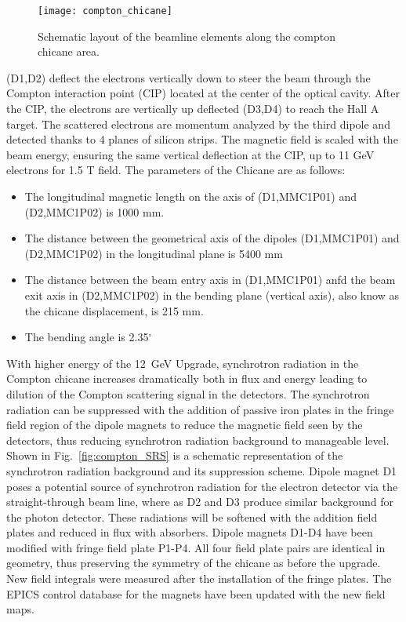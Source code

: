{\begin{figure}[htp]
    \begin{center}
        \texttt{[image: compton\_chicane]}
    \end{center}
    \caption[compton:chicane schematic]{
            Schematic layout of the beamline elements along the compton chicane area.
            }
    \label{fig:compton_chicane}
 \end{figure}
(D1,D2) deflect  the electrons  vertically down to steer
the beam through the Compton interaction point (CIP) located at the center of
the optical cavity. After the CIP, the electrons are vertically up deflected (D3,D4) to reach
the Hall A target. The scattered electrons are momentum analyzed by the third dipole and
detected thanks to 4 planes of silicon strips.
The magnetic field is scaled with the beam energy, ensuring the same vertical deflection at the CIP,
up to 11 GeV electrons for 1.5 T field. The parameters of the Chicane are as follows:
\begin{itemize}
	\item The longitudinal magnetic length on the axis of (D1,MMC1P01) and
	(D2,MMC1P02) is 1000 mm.
       \item The distance between the geometrical axis of the
        dipoles (D1,MMC1P01) and (D2,MMC1P02) in the longitudinal plane is 5400 mm
	\item The distance between the beam entry axis in (D1,MMC1P01) anfd the
        beam exit axis in (D2,MMC1P02) in the bending plane (vertical axis), also know as the chicane displacement, is 215 mm.
       \item The bending angle is 2.35$^{\circ}$
\end{itemize}

With higher energy of the 12~GeV Upgrade, synchrotron radiation in the Compton chicane increases dramatically both in flux and energy leading to  dilution of the Compton scattering signal in the detectors. The synchrotron radiation can be suppressed with the  addition of  passive iron plates in the fringe field region of the dipole magnets to reduce the magnetic field seen by the  detectors, thus reducing synchrotron radiation background  to manageable level. Shown in Fig.~\ref{fig:compton_SRS} is a schematic representation of the synchrotron radiation background and its suppression scheme. Dipole magnet D1 poses a potential source of synchrotron radiation for the electron detector via  the straight-through beam line, where as D2 and D3 produce similar background for the photon detector.  These radiations  will be softened with the addition field plates and reduced in flux with absorbers. Dipole magnets D1-D4 have been modified with fringe field plate P1-P4. All four field plate pairs  are identical in geometry, thus preserving the symmetry of the chicane as before the upgrade.  New field integrals were measured after the installation of the fringe plates. The EPICS control database for the magnets have been updated with the new field maps.

}
